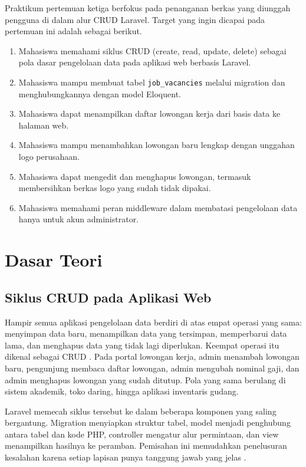 \documentclass[12pt,a4paper]{article}
\begin{document}
Praktikum pertemuan ketiga berfokus pada penanganan berkas yang diunggah pengguna di dalam alur CRUD Laravel. Target yang ingin dicapai pada pertemuan ini adalah sebagai berikut.

\begin{enumerate}[leftmargin=1.4cm, itemsep=4pt]
  \item Mahasiswa memahami siklus CRUD (create, read, update, delete) sebagai pola dasar pengelolaan data pada aplikasi web berbasis Laravel.
  \item Mahasiswa mampu membuat tabel \texttt{job\_vacancies} melalui migration dan menghubungkannya dengan model Eloquent.
  \item Mahasiswa dapat menampilkan daftar lowongan kerja dari basis data ke halaman web.
  \item Mahasiswa mampu menambahkan lowongan baru lengkap dengan unggahan logo perusahaan.
  \item Mahasiswa dapat mengedit dan menghapus lowongan, termasuk membersihkan berkas logo yang sudah tidak dipakai.
  \item Mahasiswa memahami peran middleware dalam membatasi pengelolaan data hanya untuk akun administrator.
\end{enumerate}

\section{Dasar Teori}

\subsection{Siklus CRUD pada Aplikasi Web}

Hampir semua aplikasi pengelolaan data berdiri di atas empat operasi yang sama: menyimpan data baru, menampilkan data yang tersimpan, memperbarui data lama, dan menghapus data yang tidak lagi diperlukan. Keempat operasi itu dikenal sebagai CRUD \cite{fowler2003}. Pada portal lowongan kerja, admin menambah lowongan baru, pengunjung membaca daftar lowongan, admin mengubah nominal gaji, dan admin menghapus lowongan yang sudah ditutup. Pola yang sama berulang di sistem akademik, toko daring, hingga aplikasi inventaris gudang.

Laravel memecah siklus tersebut ke dalam beberapa komponen yang saling bergantung. Migration menyiapkan struktur tabel, model menjadi penghubung antara tabel dan kode PHP, controller mengatur alur permintaan, dan view menampilkan hasilnya ke peramban. Pemisahan ini memudahkan penelusuran kesalahan karena setiap lapisan punya tanggung jawab yang jelas \cite{laravel2026controllers}.
\end{document}
